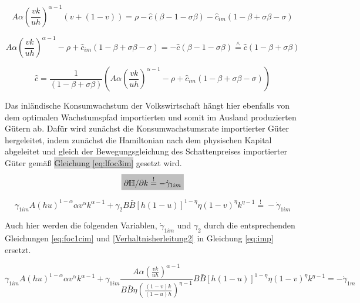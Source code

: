 	\begin{equation*}
		A \alpha \left(\frac{vk}{uh}\right)^{\alpha -1}(v+(1-v))= \rho - \hat{c} (\beta -1 - \sigma \beta)-\hat{c}_{im}(1- \beta + \sigma \beta - \sigma)
	\end{equation*}


	\begin{equation*}
		A \alpha \left(\frac{vk}{uh}\right)^{\alpha -1}- \rho +\hat{c}_{im}(1- \beta + \sigma \beta - \sigma)=- \hat{c}  (\beta -1 - \sigma \beta) \overset{\wedge}{=} \hat{c}(1- \beta+ \sigma \beta)
	\end{equation*}


	\begin{equation}
		\boxed{
		\hat{c}=\frac{1}{(1-\beta+\sigma\beta)}\left(A\alpha \left(\frac{vk}{uh}\right)^{\alpha -1}-\rho+\hat{c}_{im}(1-\beta+\sigma\beta-\sigma)\right)}\label{eq:lKRR}
	\end{equation}


Das inländische Konsumwachstum der Volkswirtschaft hängt hier ebenfalls von dem optimalen Wachstumspfad importierten und somit im Ausland produzierten Gütern ab. Dafür wird zunächst die Konsumwachstumsrate importierter Güter hergeleitet, indem zunächst die Hamiltonian nach dem physischen Kapital abgeleitet und gleich der Bewegungsgleichung des Schattenpreises importierter Güter gemä{\ss} \colorbox{lightgray}{Gleichung \eqref{eq:lfoc3im}} gesetzt wird.\\


	\begin{equation*}
		\colorbox{lightgray}{$\partial\mathbb{H}/\partial k\overset{!}{=}-\dot{\gamma}_{1im}$}
	\end{equation*}


	\begin{equation}
		\gamma_{1 im}A(hu)^{1- \alpha}\alpha v^{\alpha} k^{\alpha -1} + \gamma_{2}B\bar{B} [h(1-u)]^{1- \eta} \eta(1-v)^{\eta}k^{\eta -1} \overset{!}{=} - \dot{\gamma}_{1im}\label{eq:imp}
	\end{equation}


Auch hier werden die folgenden Variablen, $\dot{\gamma}_{1im}$ und $\gamma_2$ durch die entsprechenden Gleichungen \eqref{eq:foc1cim} und \eqref{Verhaltnisherleitung2} in Gleichung \eqref{eq:imp} ersetzt. 


	\begin{equation*}
		\gamma_{1im}A(hu)^{1- \alpha}\alpha v^{\alpha} k^{\alpha -1} +\gamma_{1im} \frac{A\alpha \left(\frac{vk}{uh}\right)^{\alpha-1}}{B\bar{B}\eta\left(\frac{(1-v)k}{(1-u)h}\right)^{\eta-1}} B\bar{B} [h(1-u)]^{1- \eta} \eta(1-v)^{\eta}k^{\eta -1} = - \dot{\gamma}_{1m}
	\end{equation*}


